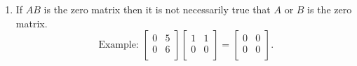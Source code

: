 \documentclass{report}
\begin{document}
{\begin{enumerate}[label=(\arabic*).]
\begin{multicols}{2}
\[{\begin{bmatrix}
          0 & 0\\
      \end{bmatrix}} = \overset{AB}{ \begin{bmatrix}
      1 & 2\\
      2 & 4\\
  \end{bmatrix}}
              .\] 
              \[
              \underbrace{ \begin{bmatrix}
              1 & 5\\
              2 & 6\\
              \end{bmatrix} }_{ A } \underbrace{ \begin{bmatrix}
              1 & 2\\
              0 & 0\\
              \end{bmatrix} }_{ C } = \underbrace{ \begin{bmatrix}
              1 & 2\\
              2 & 4\\
        \end{bmatrix} }_{ AC }
              .\] 
        \end{multicols}
      \item If $ AB$ is the zero matrix then it is not necessarily true that $ A$ or $ B$ is the zero matrix.\\
        \[
        \text{ Example: } \begin{bmatrix}
        0 & 5\\
        0 & 6\\
        \end{bmatrix} \begin{bmatrix}
        1 & 1\\
        0 & 0\\
        \end{bmatrix} = \begin{bmatrix}
        0 & 0\\
        0 & 0\\
        \end{bmatrix}
        .\] 
    \end{enumerate}
    }
      
    
    
    
  
  



 

 
   
   
 

          
 
 
 
 
 
 

   
\end{document}
